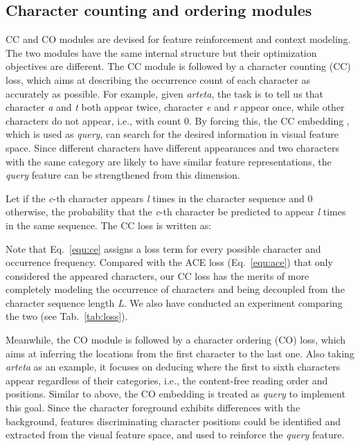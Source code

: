 \documentclass[10pt,journal,compsoc]{IEEEtran}
\begin{document}
\subsection{Character counting and ordering modules}
CC and CO modules are devised for feature reinforcement and context modeling. The two modules have the same internal structure but their optimization objectives are different. The CC module is followed by a character counting (CC) loss, which aims at describing the occurrence count of each character as accurately as possible. For example, given \emph{arteta}, the task is to tell us that character \emph{a} and \emph{t} both appear twice, character \emph{e} and \emph{r} appear once, while other characters do not appear, i.e., with count 0. By forcing this, the CC embedding , which is used as \emph{query}, can search for the desired information in visual feature space. Since different characters have different appearances and two characters with the same category are likely to have similar feature representations, the \emph{query} feature can be strengthened from this dimension. 

Let  if the \emph{c}-th character appears \emph{l} times in the character sequence and 0 otherwise,  the probability that the \emph{c}-th character be predicted to appear \emph{l} times in the same sequence. The CC loss  is written as:


Note that Eq.~\ref{equ:ce} assigns a loss term for every possible character and occurrence frequency. Compared with the ACE loss (Eq.~\ref{equ:ace}) \cite{xie2019aggregation} that only considered the appeared characters, our CC loss has the merits of more completely modeling the occurrence of characters and being decoupled from the character sequence length \emph{L}. We also have conducted an experiment comparing the two (see Tab.~\ref{tab:loss}).




Meanwhile, the CO module is followed by a character ordering (CO) loss, which aims at inferring the locations from the first character to the last one. Also taking \emph{arteta} as an example, it focuses on deducing where the first to sixth characters appear regardless of their categories, i.e., the content-free reading order and positions. Similar to above, the CO embedding  is treated as \emph{query} to implement this goal. Since the character foreground exhibits differences with the background, features discriminating character positions could be identified and extracted from the visual feature space, and used to reinforce the \emph{query} feature.
\end{document}
